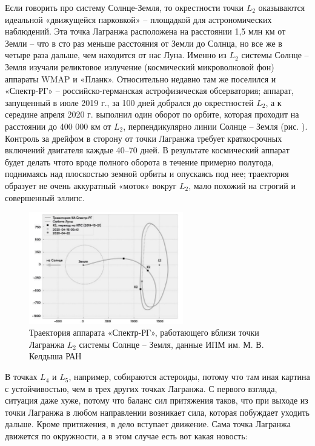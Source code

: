 \documentclass[a4paper,12pt]{article}
\begin{document}
Если говорить про систему Солнце-Земля, то окрестности точки $L_2$ оказываются идеальной «движущейся парковкой» – площадкой для астрономических наблюдений. Эта точка
Лагранжа расположена на расстоянии 1,5 млн км от Земли – что в сто раз меньше расстояния
от Земли до Солнца, но все же в четыре раза дальше, чем находится от нас Луна. Именно
из $L_2$ системы Солнце – Земля изучали реликтовое излучение (космический микроволновой
фон) аппараты WMAP и «Планк». Относительно недавно там же поселился и «Спектр-РГ» –
российско-германская астрофизическая обсерватория; аппарат, запущенный в июле 2019 г., за
100 дней добрался до окрестностей $L_2$, а к середине апреля 2020 г. выполнил один оборот по
орбите, которая проходит на расстоянии до 400 000 км от $L_2$, перпендикулярно линии Солнце –
Земля (рис. ). Контроль за дрейфом в сторону от точки Лагранжа требует краткосрочных включений двигателя каждые 40–70 дней.
В результате космический аппарат будет делать чтото вроде полного оборота в течение примерно полугода, поднимаясь над плоскостью земной
орбиты и опускаясь под нее; траектория образует не очень аккуратный «моток» вокруг $L_2$, мало
похожий на строгий и совершенный эллипс.
\begin{figure}[H]
    \begin{center}
        \includegraphics[width=0.6\textwidth]{spektrG.jpg}
	\caption{Траектория аппарата «Спектр-РГ», работающего вблизи точки Лагранжа $L_2$
системы Солнце – Земля, данные ИПМ им. М. В. Келдыша РАН}
    \end{center}
\end{figure}
В точках $L_4$ и $L_5$, например, собираются астероиды, потому что там иная картина с устойчивостью, чем в трех других точках Лагранжа.
С первого взгляда, ситуация даже хуже, потому что баланс сил притяжения таков, что при выходе из точки Лагранжа
в любом направлении возникает сила, которая побуждает уходить дальше.
Кроме притяжения, в дело вступает движение.
Сама точка Лагранжа движется по окружности, а в этом случае есть вот какая новость:
\end{document}
